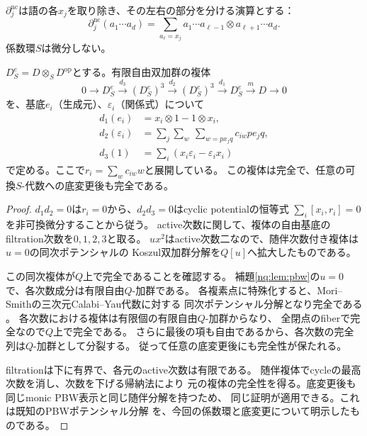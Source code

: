 $\partial^{\mathrm{nc}}_j$は語の各$x_j$を取り除き、その左右の部分を分ける演算とする：
\begin{equation}
 \partial^{\mathrm{nc}}_j(a_1\cdots a_d)
 =\sum_{a_\ell=x_j} a_1\cdots a_{\ell-1}\otimes a_{\ell+1}\cdots a_d.
\end{equation}
係数環$S$は微分しない。
\begin{proposition}[底変更と両立する第一ブロックの相対対角]
\label{nq:prop:relative-diagonal}
$D^e_S=D\otimes_S D^{\mathrm{op}}$とする。有限自由双加群の複体
\begin{equation}
 0\longrightarrow D^e_S
 \xrightarrow{d_3}(D^e_S)^3
 \xrightarrow{d_2}(D^e_S)^3
 \xrightarrow{d_1}D^e_S
 \xrightarrow{m}D\longrightarrow0
 \label{nq:eq:potential-resolution}
\end{equation}
を、基底$e_i$（生成元）、$\varepsilon_i$（関係式）について
\begin{equation}\begin{aligned}
 d_1(e_i)&=x_i\otimes1-1\otimes x_i,\\
 d_2(\varepsilon_i)&=\sum_j\sum_w\ \sum_{w=p x_j q} c_{iw}p e_j q,\\
 d_3(1)&=\sum_i(x_i\varepsilon_i-\varepsilon_i x_i)
\end{aligned}\end{equation}
で定める。ここで$r_i=\sum_w c_{iw}w$と展開している。
この複体は完全で、任意の可換$S$-代数への底変更後も完全である。
\end{proposition}
\begin{proof}
$d_1d_2=0$は$r_i=0$から、$d_2d_3=0$はcyclic potentialの恒等式
$\sum_i[x_i,r_i]=0$を非可換微分することから従う。
active次数に関して、複体の自由基底のfiltration次数を$0,1,2,3$と取る。
$ux^2$はactive次数二なので、随伴次数付き複体は$u=0$の同次ポテンシャルの
Koszul双加群分解を$Q[u]$へ拡大したものである。

この同次複体が$Q$上で完全であることを確認する。
補題\ref{nq:lem:pbw}の$u=0$で、各次数成分は有限自由$Q$-加群である。
各複素点に特殊化すると、Mori--Smithの三次元Calabi--Yau代数に対する
同次ポテンシャル分解となり完全である
\cite[Theorem 4.2]{PMoriSmith}\cite[\S3.2]{PBergerTaillefer}。
各次数における複体は有限個の有限自由$Q$-加群からなり、
全閉点のfiberで完全なので$Q$上で完全である。
さらに最後の項も自由であるから、各次数の完全列は$Q$-加群として分裂する。
従って任意の底変更後にも完全性が保たれる。

filtrationは下に有界で、各元のactive次数は有限である。
随伴複体でcycleの最高次数を消し、次数を下げる帰納法により
元の複体の完全性を得る。底変更後も同じmonic PBW表示と同じ随伴分解を持つため、
同じ証明が適用できる。これは既知のPBWポテンシャル分解
\cite[Theorem 3.6の証明]{PBergerTaillefer}を、今回の係数環と底変更について明示したものである。
\end{proof}

